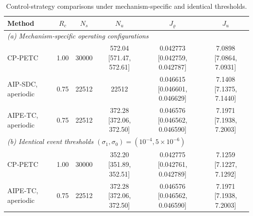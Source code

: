 \begin{table}[t]
\centering
\caption{Control-strategy comparisons under mechanism-specific and identical thresholds.}
\label{tab:strategy_final}
\scriptsize
\renewcommand{\arraystretch}{1.18}
\begin{tabular}{lccccc}
\toprule
Method & $R_c$ & $N_s$ & $N_u$ & $J_\varrho$ & $J_u$ \\
\midrule
\multicolumn{6}{l}{\textit{(a) Mechanism‑specific operating configurations}}\\
CP‑PETC & 1.00 & 30000 & 572.04 [571.47, 572.61] & 0.042773 [0.042759, 0.042787] & 7.0898 [7.0864, 7.0931] \\
AIP‑SDC, aperiodic & 0.75 & 22512 & 22512 & 0.046615 [0.046601, 0.046629] & 7.1408 [7.1375, 7.1440] \\
AIPE‑TC, aperiodic & 0.75 & 22512 & 372.28 [372.06, 372.50] & 0.046576 [0.046562, 0.046590] & 7.1971 [7.1938, 7.2003] \\
\midrule
\multicolumn{6}{l}{\textit{(b) Identical event thresholds $(\sigma_1,\sigma_0)=(10^{-4},5\times10^{-6})$}}\\
CP‑PETC & 1.00 & 30000 & 352.20 [351.89, 352.51] & 0.042775 [0.042761, 0.042789] & 7.1259 [7.1227, 7.1292] \\
AIPE‑TC, aperiodic & 0.75 & 22512 & 372.28 [372.06, 372.50] & 0.046576 [0.046562, 0.046590] & 7.1971 [7.1938, 7.2003] \\
\bottomrule
\end{tabular}
\end{table}
